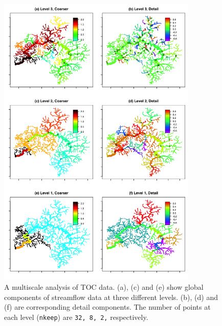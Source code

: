 \documentclass[11pt,titlepage]{article}
\begin{document}
\begin{figure}
	\centering\includegraphics[width=0.85\textwidth]{Stream_result/result_TOC_detail3(rev).png}
	\vspace{-2mm}
	\caption{A multiscale analysis of TOC data. (a), (c) and (e) show global components of streamflow data at three different levels.  (b), (d)  and (f) are corresponding detail components. The number of points at each level (\texttt{nkeep}) are \texttt{32, 8, 2,} respectively.}
	\label{fig:resultBODdetail}
\end{figure}
\end{document}
